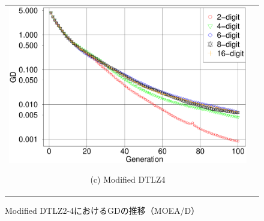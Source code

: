 \documentclass[../main/main]{subfiles}
\begin{document}
\begin{figure}[htbp]
\begin{tabular}{cc}
\begin{minipage}{0.32\hsize}
\includegraphics[width=1\linewidth]{../figures/MOEAD/DTLZ4_another_GD.eps}
\begin{center}
{\footnotesize (c) Modified DTLZ4}
\end{center}
\end{minipage}
\end{tabular}
\caption{Modified DTLZ2-4におけるGDの推移（MOEA/D）}
\label{fig:gd_mod_moead}
\end{figure}
\end{document}

